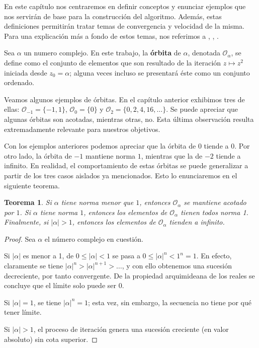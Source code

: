 \documentclass[oneside,11pt]{book}
\theoremstyle{definition}
\theoremstyle{plain}
\newtheorem{theorem}[counter]{Teorema}
\theoremstyle{remark}
\begin{document}
En este cap\'itulo nos centraremos en definir conceptos y enunciar ejemplos que nos servir\'an de base 
para la construcci\'on del algoritmo.
Adem\'as, estas definiciones permitir\'an tratar temas de convergencia y velocidad de la misma. 
Para una explicaci\'on m\'as a fondo de estos temas, nos referimos a \cite{Carleson}, \cite{PoirierPolinomios}, \cite{Lang}.

Sea $\alpha$ un numero complejo.
En este trabajo, 
la \textbf{\'orbita} de $\alpha$, denotada $\mathcal{O}_\alpha$, 
se define como el conjunto de elementos que 
son resultado de la iteraci\'on $z\mapsto z^2$ iniciada desde $z_0=\alpha$; 
alguna veces incluso se presentar\'a \'este como un conjunto ordenado. 

Veamos algunos ejemplos de \'orbitas. 
En el cap\'itulo anterior exhibimos tres de ellas: 
$\mathcal{O}_{-1}=\{-1,1\}$, $\mathcal{O}_0=\{0\}$ y $\mathcal{O}_2=\{0,2,4,16,\dots\}$. 
Se puede apreciar que algunas \'orbitas son acotadas, mientras otras, no.
Esta \'ultima observaci\'on resulta extremadamente relevante para nuestros objetivos.

Con los ejemplos anteriores podemos apreciar que la \'orbita de $0$ tiende a $0$.
Por otro lado, la \'orbita de $-1$ mantiene norma $1$, 
mientras que la de $-2$ tiende a infinito.
En realidad, el comportamiento de estas \'orbitas se puede generalizar a partir de los tres casos aislados ya mencionados. 
Esto lo enunciaremos en el siguiente teorema.

\begin{theorem}
Si $\alpha$ tiene norma menor que $1$, entonces $\mathcal{O}_\alpha$ se mantiene acotado por $1$. 
Si $\alpha$ tiene norma $1$, entonces los elementos de $\mathcal{O}_\alpha$ tienen todos norma 1. 
Finalmente, si $|\alpha|>1$, entonces los elementos de $\mathcal{O}_\alpha$ tienden a infinito.
\end{theorem}
\begin{proof}
Sea $\alpha$ el n\'umero complejo en cuesti\'on.

Si $|\alpha|$ es menor a 1, de 
$0\leq| \alpha |<1$ se pasa a $0\leq |\alpha|^n<1^n=1$. 
En efecto, claramente se tiene $|\alpha|^n>|\alpha|^{n+1}>\dots$, 
y con ello obtenemos una sucesi\'on decreciente, por tanto convergente. 
De la propiedad arquimideana de los reales se concluye que el l\'imite solo puede ser $0$. 

Si $|\alpha|=1$, se tiene $|\alpha|^n=1$; esta vez, sin embargo, la secuencia no tiene por qu\'e tener l\'imite. 

Si $|\alpha|>1$, el proceso de iteraci\'on genera una sucesi\'on creciente (en valor absoluto) sin cota superior. 
\end{proof}
\end{document}
